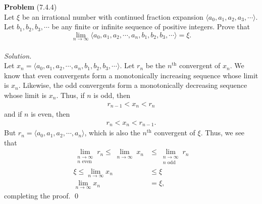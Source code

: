\documentclass[12 pt]{amsart}
\begin{document}
\phantom{\quad} \vfill
\noindent
\textbf{Problem} (7.4.4) \\[4ex]
  Let $\xi$ be an irrational number with continued fraction expansion
  $\langle a_0, a_1, a_2, a_3, \cdots \rangle$.
  Let $b_1, b_2, b_3, \cdots$ be any finite or infinite sequence
  of positive integers. 
  Prove that 
  \[
    \lim_{n \to \infty}
    \langle a_0, a_1, a_2, \cdots, a_n,
            b_1, b_2, b_3, \cdots \rangle
    = \xi.
  \]
  \\[2ex]
\emph{Solution.} \\[2ex]
  Let $x_n = 
  \langle a_0, a_1, a_2, \cdots, a_n, b_1, b_2, b_3, \cdots \rangle$.
  Let $r_n$ be the $n^{\text{th}}$ convergent %
  of $x_n$.
  We know that even convergents form a monotonically
  increasing sequence whose limit is $x_n$.
  Likewise, the odd convergents form a monotonically 
  decreasing sequence whose limit is $x_n$.
  Thus, if $n$ is odd, then 
  \begin{align*}
    r_{n-1} < x_n < r_n
  \end{align*}
  and if $n$ is even, then
  \begin{align*}
    r_{n} < x_n < r_{n-1}.
  \end{align*}
  But $r_n = \langle a_0, a_1, a_2, \cdots, a_n \rangle$, which
  is also the $n^{\text{th}}$ convergent of $\xi$.
  Thus, we see that 
  \begin{align*}
    \lim_{\substack{n \to \infty \\ \text{$n$ even}}}
    r_n \leq 
    \lim_{\substack{n \to \infty}}
    x_n &\leq
    \lim_{\substack{n \to \infty \\ \text{$n$ odd}}}
    r_n \\
    \xi \leq \lim_{n \to \infty} x_n &\leq \xi \\
    \lim_{n \to \infty} x_n &= \xi,
  \end{align*}
  completing the proof.
  \qed
\end{document}
